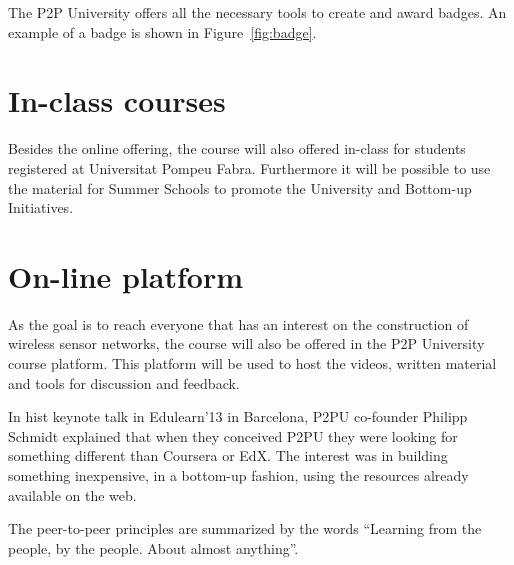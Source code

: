 \documentclass[oneside]{book}   %
\begin{document}
The P2P University offers all the necessary tools to create and award badges.
An example of a badge is shown in Figure~\ref{fig:badge}.



\section{In-class courses}
Besides the online offering, the course will also offered in-class for students registered at Universitat Pompeu Fabra.
Furthermore it will be possible to use the material for Summer Schools to promote the University and Bottom-up Initiatives.

\section{On-line platform}

As the goal is to reach everyone that has an interest on the construction of wireless sensor networks, the course will also be offered in the P2P University course platform.
This platform will be used to host the videos, written material and tools for discussion and feedback.

In hist keynote talk in Edulearn'13 in Barcelona, P2PU co-founder Philipp Schmidt explained that when they conceived P2PU they were looking for something different than Coursera or EdX.
The interest was in building something inexpensive, in a bottom-up fashion, using the resources already available on the web.

The peer-to-peer principles are summarized by the words ``Learning from the people, by the people. About almost anything''.
\end{document}
